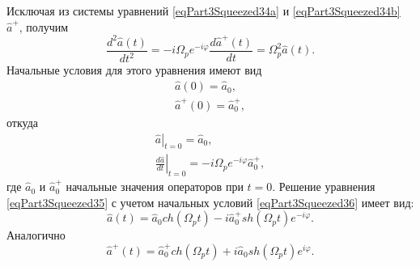 Исключая из системы уравнений \eqref{eqPart3Squeezed34a} и
\eqref{eqPart3Squeezed34b} $\hat{a}^{+}$, получим
\begin{equation}
\frac{d^2\hat{a}\left(t\right)}{dt^2} = 
- i \Omega_p e^{- i \varphi}
\frac{d\hat{a}^{+}\left(t\right)}{dt} = 
\Omega_p^2\hat{a}\left(t\right).
\label{eqPart3Squeezed35}
\end{equation}
Начальные условия для этого уравнения имеют вид
\begin{eqnarray}
\hat{a}\left(0\right) = \hat{a}_0, 
\nonumber \\
\hat{a}^{+}\left(0\right) = \hat{a}^{+}_0, 
\nonumber
\end{eqnarray}
откуда
\begin{eqnarray}
\left.\hat{a}\right|_{t=0} = \hat{a}_0, 
\nonumber \\
\left.\frac{d\hat{a}}{dt}\right|_{t=0} = 
- i \Omega_p e^{- i \varphi} \hat{a}^{+}_0,
\label{eqPart3Squeezed36}
\end{eqnarray}
где $\hat{a}_0$ и $\hat{a}^{+}_0$ начальные значения операторов при $t
= 0$. Решение уравнения \eqref{eqPart3Squeezed35} с учетом начальных
условий \eqref{eqPart3Squeezed36} имеет вид:
\begin{equation}
\hat{a}\left(t\right) = \hat{a}_0 ch \left(\Omega_p t \right) - 
i \hat{a}^{+}_0 sh \left(\Omega_p t\right) e^{-i \varphi}.
\label{eqPart3Squeezed37a}
\end{equation}
Аналогично
\begin{equation}
\hat{a}^{+}\left(t\right) = \hat{a}^{+}_0 ch \left(\Omega_p t \right) +
i \hat{a}_0 sh \left(\Omega_p t\right) e^{i \varphi}.
\label{eqPart3Squeezed37b}
\end{equation}



